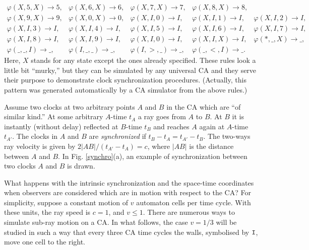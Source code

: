 \documentclass[pre,preprint,showpacs,showkeys,amsfonts]{revtex4}
\begin{document}
{\begin{equation}
\begin{array}{lllll}
  \varphi (X, 5 ,X)  \rightarrow   5 ,&
  \varphi (X, 6 ,X)  \rightarrow   6 ,&
  \varphi (X, 7 ,X)  \rightarrow   7 ,&
  \varphi (X, 8 ,X)  \rightarrow   8 ,\\
  \varphi (X, 9 ,X)  \rightarrow   9 ,&
  \varphi (X, 0 ,X)  \rightarrow   0 ,&
  \varphi (X,I, 0 )  \rightarrow  I,&
  \varphi (X,I, 1 )  \rightarrow  I,&
  \varphi (X,I, 2 )  \rightarrow  I,\\
  \varphi (X,I, 3 )  \rightarrow  I,&
  \varphi (X,I, 4 )  \rightarrow  I,&
  \varphi (X,I, 5 )  \rightarrow  I,&
  \varphi (X,I, 6 )  \rightarrow  I,&
  \varphi (X,I, 7 )  \rightarrow  I,\\
  \varphi (X,I, 8 )  \rightarrow  I,&
  \varphi (X,I, 9 )  \rightarrow  I,&
  \varphi (X,I, 0 )  \rightarrow  I,&
  \varphi (X,I,X)  \rightarrow  I,&
\varphi ( * ,\_ ,X)  \rightarrow  \_ ,\\
\varphi (\_ ,\_ ,I)  \rightarrow  \_ ,&
\varphi (I,\_ ,\_ )  \rightarrow  \_ ,&
\varphi (I, > ,\_ )  \rightarrow  \_ ,&
\varphi (\_ , < ,I)  \rightarrow  \_  .
\end{array}\nonumber
\end{equation}
}
Here,
$X$ stands for any state except the ones already specified.
These rules look a little bit ``murky,''
but they can be simulated by any universal CA and they serve their purpose
to demonstrate clock synchronization procedures.
(Actually,  this pattern was
generated automatically by a CA simulator from the above rules.)

 Assume two clocks at two arbitrary points $A$ and $B$
in the CA which are ``of similar  kind.''
 At some arbitrary $A$-time $t_A$ a  ray goes from $A$ to $B$. At $B$
it is instantly (without delay)
 reflected  at $B$-time $t_B$ and reaches $A$ again at
 $A$-time $t_{A'}$. The clocks in $A$ and $B$ are {\em synchronized}
 if
$
 t_B-t_A=t_{A'}-t_B$.
 The two-ways ray velocity is given by
$
 {2 \vert {AB}\vert / (t_{A'}-t_A)}=c
$,
 where $\vert AB\vert $ is the distance between $A$ and $B$.
In Fig. \ref{synchro}(a), an example of synchronization between two clocks
$A$ and $B$
is drawn.

What happens with the intrinsic
synchronization and the space-time
coordinates when observers are considered which are in motion with respect to the
CA? For simplicity, suppose a constant motion of $v$ automaton cells
per time cycle. With these units, the ray speed is $c=1$, and $v\le 1$.
There are numerous ways to simulate sub-ray motion on a CA. In what
follows, the case $v=1/3$ will be studied in such a way that every three
CA time cycles the walls, symbolised by ${\tt I}$, move one cell to the
right.
\end{document}

